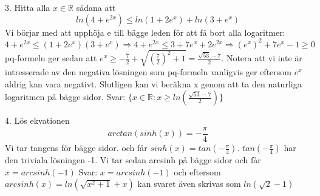 \documentclass{article}
\begin{document}
  3. Hitta alla $x \in \mathbb{R}$ sådana att 
  \begin{equation}
      ln(4 + e^{2x}) \leq ln(1 + 2e^x) + ln(3 + e^x)
  \end{equation}
  Vi börjar med att upphöja e till bägge leden för att få bort alla logaritmer:\newline
  $4 + e^{2x} \leq (1 + 2e^x)(3 + e^x) \Rightarrow 4 + e^{2x} \leq 3 + 7e^x + 2e^{2x} \Rightarrow (e^x)^2 + 7e^x - 1 \geq 0$\newline pq-formeln ger sedan att $e^x \geq -\frac{7}{2} + \sqrt{(\frac{7}{2})^2 + 1} = \frac{\sqrt{53} - 7}{2}$. Notera att vi inte är intresserade av den negativa lösningen som pq-formeln vanligvis ger eftersom $e^x$ aldrig kan vara negativt. Slutligen kan vi beräkna x genom att ta den naturliga logaritmen på bägge sidor.\newline \newline
  Svar: $\{x \in \mathbb{R}: x \geq ln(\frac{\sqrt{53} - 7}{2})\}$\newline
  
  4. Lös ekvationen 
  \begin{equation}
      arctan(sinh(x)) = -\frac{\pi}{4}
  \end{equation}
  Vi tar tangens för bägge sidor. och får $sinh(x) = tan(-\frac{\pi}{4})$. $tan(-\frac{\pi}{4})$ har den triviala lösningen -1. Vi tar sedan arcsinh på bägge sidor och får $x = arcsinh(-1)$ \newline \newline
  Svar: $x = arcsinh(-1)$ och eftersom $arcsinh(x) = ln(\sqrt{x^2 + 1} + x)$ kan svaret även skrivas som $ln(\sqrt{2} - 1)$
  
\end{document}
